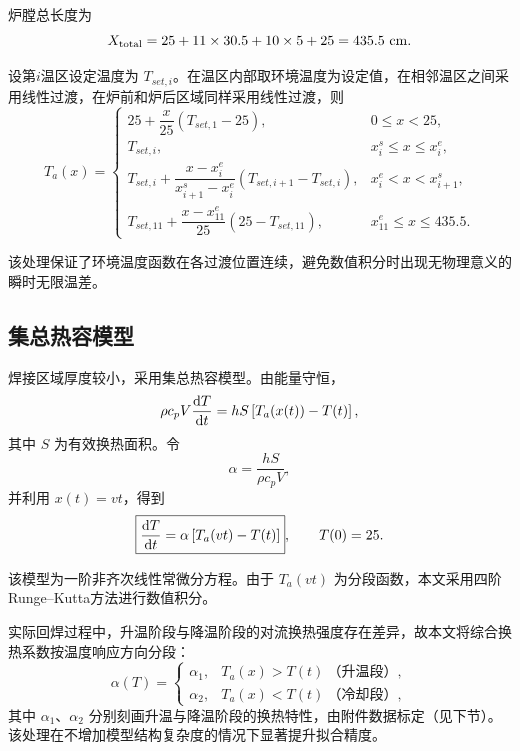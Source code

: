 \documentclass{cumcmthesis}
\begin{document}
炉膛总长度为
\begin{equation}
X_{\rm total}
=25+11\times30.5+10\times5+25
=435.5\ {\rm cm}.
\end{equation}

设第$i$温区设定温度为 $T_{set,i}$。在温区内部取环境温度为设定值，在相邻温区之间采用线性过渡，在炉前和炉后区域同样采用线性过渡，则
\begin{equation}
T_a(x)=
\begin{cases}
25+\dfrac{x}{25}(T_{set,1}-25),
&0\le x<25,\\[8pt]
T_{set,i},
&x_i^s\le x\le x_i^e,\\[8pt]
T_{set,i}
+\dfrac{x-x_i^e}{x_{i+1}^s-x_i^e}
(T_{set,i+1}-T_{set,i}),
&x_i^e<x<x_{i+1}^s,\\[8pt]
T_{set,11}
+\dfrac{x-x_{11}^e}{25}(25-T_{set,11}),
&x_{11}^e\le x\le435.5.
\end{cases}
\label{eq:Ta}
\end{equation}

该处理保证了环境温度函数在各过渡位置连续，避免数值积分时出现无物理意义的瞬时无限温差。

\subsection{集总热容模型}

焊接区域厚度较小，采用集总热容模型。由能量守恒，
\begin{equation}
\rho c_p V\frac{{\rm d}T}{{\rm d}t}
=hS\left[T_a(x(t))-T(t)\right],
\end{equation}
其中 $S$ 为有效换热面积。令
\begin{equation}
\alpha=\frac{hS}{\rho c_pV},
\end{equation}
并利用 $x(t)=vt$，得到
\begin{equation}
\boxed{
\frac{{\rm d}T}{{\rm d}t}
=\alpha\left[T_a(vt)-T(t)\right]
},
\qquad
T(0)=25.
\label{eq:ode}
\end{equation}

该模型为一阶非齐次线性常微分方程。由于 $T_a(vt)$ 为分段函数，本文采用四阶Runge--Kutta方法进行数值积分。

实际回焊过程中，升温阶段与降温阶段的对流换热强度存在差异，故本文将综合换热系数按温度响应方向分段：
\begin{equation}
\alpha(T)=\begin{cases}
\alpha_1, & T_a(x)>T(t)\ \text{（升温段）},\\
\alpha_2, & T_a(x)<T(t)\ \text{（冷却段）},
\end{cases}
\label{eq:alpha_pw}
\end{equation}
其中 $\alpha_1$、$\alpha_2$ 分别刻画升温与降温阶段的换热特性，由附件数据标定（见下节）。该处理在不增加模型结构复杂度的情况下显著提升拟合精度。
\end{document}
